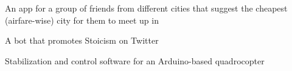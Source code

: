 \smallskip

An app for a group of friends from different cities that suggest the cheapest (airfare-wise) city for them to meet up in

\smallskip

A bot that promotes Stoicism on Twitter

\smallskip


\smallskip

Stabilization and control software for an Arduino-based quadrocopter

\smallskip

